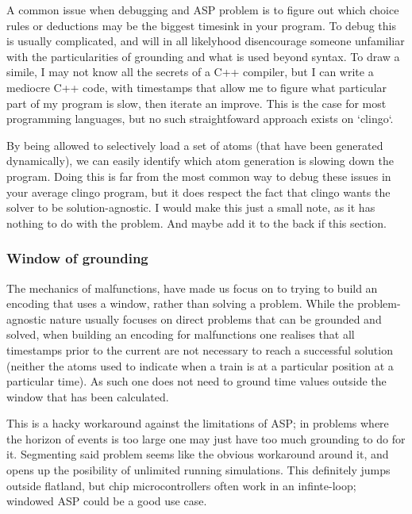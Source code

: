A common issue when debugging and ASP problem is to figure out which choice rules or deductions may be the biggest timesink in your program. To debug this is usually complicated, and will in all likelyhood disencourage someone unfamiliar with the particularities of grounding and what is used beyond syntax. To draw a simile, I may not know all the secrets of a C++ compiler, but I can write a mediocre C++ code, with timestamps that allow me to figure what particular part of my program is slow, then iterate an improve. This is the case for most programming languages, but no such straightfoward approach exists on `clingo`.

By being allowed to selectively load a set of atoms (that have been generated dynamically), we can easily identify which atom generation is slowing down the program. Doing this is far from the most common way to debug these issues in your average clingo program, but it does respect the fact that clingo wants the solver to be solution-agnostic. 
\color{black} \color{gray} I would make this just a small note, as it has nothing to do with the problem. And maybe add it to the back if this section. \color{black}


\subsubsection{Window of grounding}

The mechanics of malfunctions, have made us focus on to trying to build an encoding that uses a window, rather than solving a problem. While the problem-agnostic nature usually focuses on direct problems that can be grounded and solved, when building an encoding for malfunctions one realises that all timestamps prior to the current are not necessary to reach a successful solution (neither the atoms used to indicate when a train is at a particular position at a particular time). As such one does not need to ground time values outside the window that has been calculated.

This is a hacky workaround against the limitations of ASP; in problems where the horizon of events is too large one may just have too much grounding to do for it. Segmenting said problem seems like the obvious workaround around it, and opens up the posibility of unlimited running simulations. This definitely jumps outside flatland, but chip microcontrollers often work in an infinte-loop; windowed ASP could be a good use case.
  
 

\color{black}


